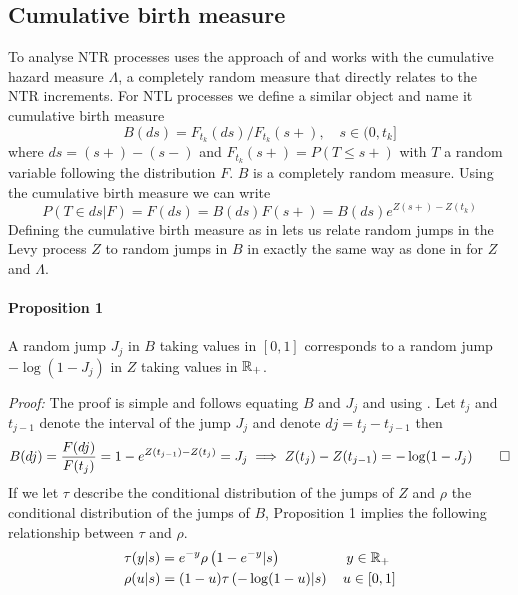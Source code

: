 \subsection{Cumulative birth measure}\label{CBM}
To analyse NTR processes \cite{james2006poisson} uses the approach of \cite{hjort1990nonparametric} and works with the cumulative hazard measure $\Lambda$, a completely random measure that directly relates to the NTR increments. For NTL processes we define a similar object and name it cumulative birth measure 
\begin{equation}\label{birth_measure}
B(ds) = F_{t_k}(ds)/F_{t_k}(s+), \quad s \in (0, t_k]
\end{equation}
where $ds = (s+) - (s-)$ and $F_{t_k}(s+) = P(T \leq s+)$ with $T$ a random variable following the distribution $F$. $B$ is a completely random measure. Using the cumulative birth measure we can write
\begin{equation*}
P(T \in ds | F) = F(ds) = B(ds)F(s+) = B(ds)e^{Z(s+) - Z(t_k)}
\end{equation*}
Defining the cumulative birth measure as in  lets us relate random jumps in the Levy process $Z$ to random jumps in $B$ in exactly the same way as done in \cite{james2006poisson} for $Z$ and $\Lambda$. 

\paragraph{Proposition 1} A random jump $J_j$ in $B$ taking values in $[0,1]$ corresponds to a random jump $-\log(1 - J_j)$ in $Z$ taking values in $\mathbb{R}_+$.

\textit{Proof:} The proof is simple and follows equating $B$ and $J_j$ and using . Let $t_j$ and $t_{j-1}$ denote the interval of the jump $J_j$ and denote $dj = t_j - t_{j-1}$ then
\begin{equation*}
\begin{split}
B(dj) = \frac{F(dj)}{F(t_j)} = 1 - e^{Z(t_{j-1}) -Z(t_j)} = J_j \implies Z(t_j) - Z(t_{j-1}) = -\log(1- J_j) \qed
\end{split}
\end{equation*}
If we let $\tau$ describe the conditional distribution of the jumps of $Z$ and $\rho$ the conditional distribution of the jumps of $B$, Proposition 1 implies the following relationship between $\tau$ and $\rho$.
\begin{equation*}
\begin{split}
&\tau(y|s) = e^{-y}\rho\left(1- e^{-y} | s\right) \ \ \qquad\qquad y \in \mathbb{R}_{+} \\ & \rho(u|s) = (1- u)\tau\left(-\log(1-u) |s\right) \quad u \in [0, 1]
\end{split}
\end{equation*}



